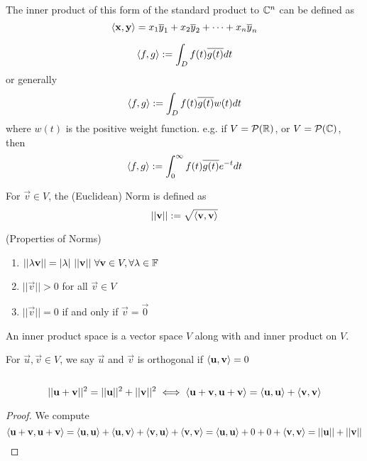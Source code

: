 \begin{remark}[Generalization to $\b C^n$]
    The inner product of this form of the standard product to $\b C^n$ can be defined as
    \[ \langle \mathbf x, \mathbf y \rangle = x_1\overline y_1 + x_2\overline y_2 + \cdots + x_n\overline y_n\]
\end{remark}
\begin{remark}
    \[ \langle f, g \rangle : = \int_D f(t)\overline{g(t)} dt\]
    or generally \[ \langle f, g \rangle : = \int_D f(t)\overline{g(t)}w(t) dt\]
    where $w(t)$ is the positive weight function. e.g. if $V = \mathcal P(\mathbb R)$, or $V = \mathcal P(\mathbb C)$, then 
    \[ \langle f, g \rangle : = \int_0^\infty f(t)\overline{g(t)}e^{-t} dt\]
\end{remark}
\begin{definition}
    For $\vec v \in V$, the (Euclidean) Norm is defined as
    \[ ||\mathbf v|| : = \sqrt{\langle \mathbf v,\mathbf v \rangle}\] 
\end{definition}
\begin{theorem}(Properties of Norms)
    \begin{enumerate}
        \item $||\lambda \vec v || = |\lambda| \ ||\vec v|| \ \forall \vec v \in V, \forall \lambda \in \b F $
        \item $||\vec v|| > 0$ for all $\vec v \in V$
        \item $||\vec v|| = 0$ if and only if $\vec v = \vec 0$ 
    \end{enumerate}
\end{theorem}
\begin{definition}
    An inner product space is a vector space $V$ along with and inner product on $V$.
\end{definition}
\begin{definition}
    For $\vec u,\vec v \in V$, we say $\vec u$ and $\vec v$ is orthogonal if $\langle \mathbf u, \mathbf v\rangle = 0$
\end{definition}
\begin{theorem} $ $
\begin{center}
\end{center}
\[ ||\mathbf u + \mathbf v||^2 = ||\mathbf u||^2 + ||\mathbf v||^2 \iff \langle \mathbf u + \mathbf v, \mathbf u + \mathbf v\rangle = \langle \mathbf u, \mathbf u \rangle + \langle \mathbf v, \mathbf v \rangle \]
\end{theorem}
\begin{proof} We compute
    \[ \langle \mathbf u + \mathbf v, \mathbf u + \mathbf v\rangle = \langle \mathbf u,\mathbf u \rangle + \langle \mathbf u , \mathbf v \rangle + \langle \mathbf v, \mathbf u \rangle + \langle \mathbf v,\mathbf v \rangle = \langle \mathbf u,\mathbf u \rangle + 0 + 0 + \langle \mathbf v,\mathbf v \rangle = ||\mathbf u|| + ||\mathbf v|| \]
\end{proof}
